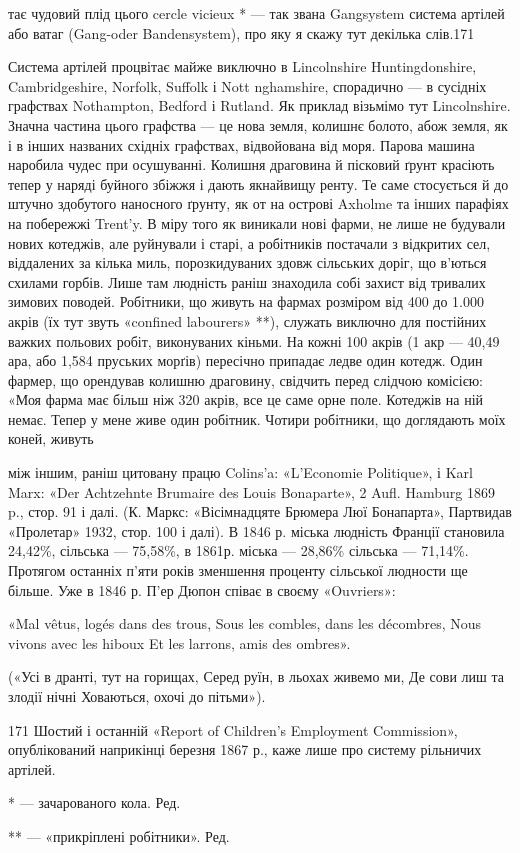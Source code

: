 тає чудовий плід цього cercle vicieux * — так звана Gangsystem
система артілей або ватаг (Gang-oder Bandensystem), про яку
я скажу тут декілька слів.171

Система артілей процвітає майже виключно в Lincolnshire
Huntingdonshire, Cambridgeshire, Norfolk, Suffolk і Nott nghamshire,
спорадично — в сусідніх графствах Nothampton, Bedford
і Rutland. Як приклад візьмімо тут Lincolnshire. Значна
частина цього графства — це нова земля, колишнє болото, абож
земля, як і в інших названих східніх графствах, відвойована від
моря. Парова машина наробила чудес при осушуванні. Колишня
драговина й пісковий ґрунт красіють тепер у наряді буйного
збіжжя і дають якнайвищу ренту. Те саме стосується й до штучно
здобутого наносного ґрунту, як от на острові Axholme та інших
парафіях на побережжі Trent’y. В міру того як виникали нові
фарми, не лише не будували нових котеджів, але руйнували і
старі, а робітників постачали з відкритих сел, віддалених за
кілька миль, порозкидуваних здовж сільських доріг, що в’ються
схилами горбів. Лише там людність раніш знаходила собі захист
від тривалих зимових поводей. Робітники, що живуть на фармах
розміром від 400 до 1.000 акрів (їх тут звуть «confined labourers» **),
служать виключно для постійних важких польових робіт, виконуваних
кіньми. На кожні 100 акрів (1 акр — 40,49 ара, або
1,584 пруських морґів) пересічно припадає ледве один котедж.
Один фармер, що орендував колишню драговину, свідчить перед
слідчою комісією: «Моя фарма має більш ніж 320 акрів, все це
саме орне поле. Котеджів на ній немає. Тепер у мене живе один
робітник. Чотири робітники, що доглядають моїх коней, живуть

між іншим, раніш цитовану працю Colins’a: «L’Economie Politique», і
Karl Marx: «Der Achtzehnte Brumaire des Louis Bonaparte», 2 Aufl.
Hamburg 1869 p., стор. 91 і далі. (К. Маркс: «Вісімнадцяте Брюмера Люї
Бонапарта», Партвидав «Пролетар» 1932, стор. 100 і далі). В 1846 р.
міська людність Франції становила 24,42\%, сільська — 75,58\%, в 1861р.
міська — 28,86\% сільська — 71,14\%. Протягом останніх п’яти років
зменшення проценту сільської людности ще більше. Уже в 1846 р. П’ер
Дюпон співає в своєму «Ouvriers»:

«Mal vêtus, logés dans des trous,
Sous les combles, dans les décombres,
Nous vivons avec les hiboux
Et les larrons, amis des ombres».

(«Усі в дранті, тут на горищах,
Серед руїн, в льохах живемо ми,
Де сови лиш та злодії нічні
Ховаються, охочі до пітьми»).

171 Шостий і останній «Report of Children’s Employment Commission»,
опублікований наприкінці березня 1867 р., каже лише про систему
рільничих артілей.

* — зачарованого кола. Ред.

** — «прикріплені робітники». Ред.
